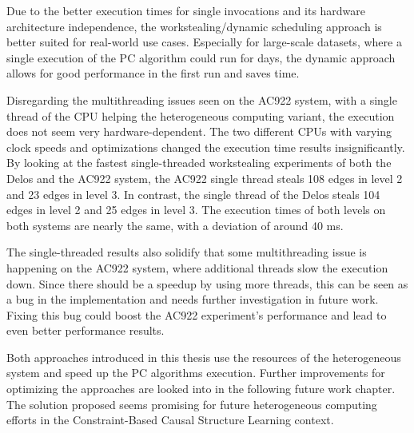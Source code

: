Due to the better execution times for single invocations and its hardware architecture independence, the workstealing/dynamic scheduling approach is better suited for real-world use cases. Especially for large-scale datasets, where a single execution of the PC algorithm could run for days, the dynamic approach allows for good performance in the first run and saves time.

Disregarding the multithreading issues seen on the AC922 system, with a single thread of the CPU helping the heterogeneous computing variant, the execution does not seem very hardware-dependent. The two different CPUs with varying clock speeds and optimizations changed the execution time results insignificantly. By looking at the fastest single-threaded workstealing experiments of both the Delos and the AC922 system, the AC922 single thread steals 108 edges in level 2 and 23 edges in level 3. In contrast, the single thread of the Delos steals 104 edges in level 2 and 25 edges in level 3. The execution times of both levels on both systems are nearly the same, with a deviation of around 40 ms.

The single-threaded results also solidify that some multithreading issue is happening on the AC922 system, where additional threads slow the execution down. Since there should be a speedup by using more threads, this can be seen as a bug in the implementation and needs further investigation in future work. Fixing this bug could boost the AC922 experiment's performance and lead to even better performance results.

Both approaches introduced in this thesis use the resources of the heterogeneous system and speed up the PC algorithms execution. Further improvements for optimizing the approaches are looked into in the following future work chapter. The solution proposed seems promising for future heterogeneous computing efforts in the Constraint-Based Causal Structure Learning context.
% 
% 
% 
% 
% 
% 